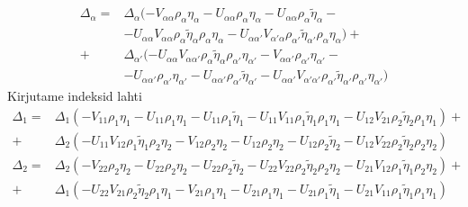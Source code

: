 \documentclass[class=article, crop=false]{standalone}
\begin{document}
\begin{equation}\label{key}
	\begin{split}
		\Delta_{ \alpha} = & \Delta_{ \alpha} (- V_{ \alpha \alpha} \rho_{ \alpha} \eta_{ \alpha} - U_{ \alpha \alpha} \rho_{ \alpha} \eta_{ \alpha} - U_{ \alpha \alpha} \rho_{ \alpha} \tilde{ \eta}_{ \alpha} - \\
		& - U_{ \alpha \alpha} V_{ \alpha \alpha} \rho_{ \alpha} \tilde{ \eta}_{ \alpha} \rho_{ \alpha} \eta_{ \alpha} - U_{ \alpha \alpha'} V_{ \alpha' \alpha} \rho_{ \alpha'} \tilde{ \eta}_{ \alpha'} \rho_{ \alpha} \eta_{ \alpha}) + \\
		+ & \Delta_{ \alpha'} (- U_{ \alpha \alpha} V_{ \alpha \alpha'} \rho_{ \alpha} \tilde{ \eta}_{ \alpha} \rho_{ \alpha'} \eta_{ \alpha'} - V_{ \alpha \alpha'} \rho_{ \alpha'} \eta_{ \alpha'} - \\
		& - U_{ \alpha \alpha'} \rho_{ \alpha'} \eta_{ \alpha'} - U_{ \alpha \alpha'} \rho_{ \alpha'} \tilde{ \eta}_{ \alpha'} - U_{ \alpha \alpha'} V_{ \alpha' \alpha'} \rho_{ \alpha'} \tilde{ \eta}_{ \alpha'} \rho_{ \alpha'} \eta_{ \alpha'})
	\end{split}
\end{equation}
Kirjutame indeksid lahti
\begin{equation}\label{key}
	\begin{split}
		\Delta_{ 1} = & \Delta_{ 1} (- V_{ 1 1} \rho_{ 1} \eta_{ 1} - U_{ 1 1} \rho_{ 1} \eta_{ 1} - U_{ 1 1} \rho_{ 1} \tilde{ \eta}_{ 1} - U_{ 1 1} V_{ 1 1} \rho_{ 1} \tilde{ \eta}_{ 1} \rho_{ 1} \eta_{ 1} - U_{ 1 2} V_{ 2 1} \rho_{ 2} \tilde{ \eta}_{ 2} \rho_{ 1} \eta_{ 1}) + \\
		+ & \Delta_{ 2} (- U_{ 1 1} V_{ 1 2} \rho_{ 1} \tilde{ \eta}_{ 1} \rho_{ 2} \eta_{ 2} - V_{ 1 2} \rho_{ 2} \eta_{ 2} - U_{ 1 2} \rho_{ 2} \eta_{ 2} - U_{ 1 2} \rho_{ 2} \tilde{ \eta}_{ 2} - U_{ 1 2} V_{ 2 2} \rho_{ 2} \tilde{ \eta}_{ 2} \rho_{ 2} \eta_{ 2}) \\
		\Delta_{ 2} = & \Delta_{ 2} (- V_{ 2 2} \rho_{ 2} \eta_{ 2} - U_{ 2 2} \rho_{ 2} \eta_{ 2} - U_{ 2 2} \rho_{ 2} \tilde{ \eta}_{ 2} - U_{ 2 2} V_{ 2 2} \rho_{ 2} \tilde{ \eta}_{ 2} \rho_{ 2} \eta_{ 2} - U_{ 2 1} V_{ 1 2} \rho_{ 1} \tilde{ \eta}_{ 1} \rho_{ 2} \eta_{ 2}) + \\
		+ & \Delta_{ 1} (- U_{ 2 2} V_{ 2 1} \rho_{ 2} \tilde{ \eta}_{ 2} \rho_{ 1} \eta_{ 1} - V_{ 2 1} \rho_{ 1} \eta_{ 1} - U_{ 2 1} \rho_{ 1} \eta_{ 1} - U_{ 2 1} \rho_{ 1} \tilde{ \eta}_{ 1} - U_{ 2 1} V_{ 1 1} \rho_{ 1} \tilde{ \eta}_{ 1} \rho_{ 1} \eta_{ 1})
	\end{split}
\end{equation}
\end{document}
